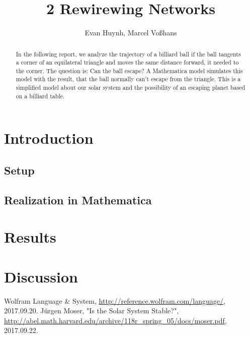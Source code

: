 \documentclass[11pt,a4paper]{article}
\begin{document}
\title{2 Rewirewing Networks}
\author{Evan Huynh, Marcel Vo{\ss}hans}
\maketitle

\begin{abstract}
In the following report, we analyze the trajectory of a billiard ball if the ball tangents a corner of an equilateral triangle and moves the same distance forward, it needed to the corner. The question is: Can the ball escape? A Mathematica model simulates this model with the result, that the ball normally can't escape from the triangle. This is a simplified model about our solar system and the possibility of an escaping planet based on a billiard table.
\end{abstract}

\tableofcontents

\section{Introduction}
\subsection{Setup}

\subsection{Realization in Mathematica}
\section{Results}
\section{Discussion}

\begin{thebibliography}{2}

 Wolfram Language \& System, \url{http://reference.wolfram.com/language/}, 2017.09.20.
  J{\"u}rgen Moser, "Is the Solar System Stable?", \url{http://abel.math.harvard.edu/archive/118r_spring_05/docs/moser.pdf}, 2017.09.22.

\end{thebibliography}
\end{document}
